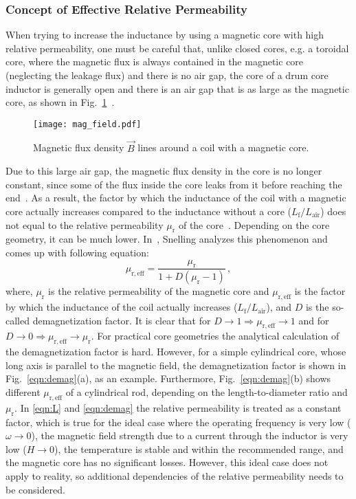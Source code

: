 \subsubsection{Concept of Effective Relative Permeability}
When trying to increase the inductance by using a magnetic core with high relative permeability, one must be careful that, unlike closed cores, e.g. a toroidal core, where the magnetic flux is always contained in the magnetic core (neglecting the leakage flux) and there is no air gap, the core of a drum core inductor is generally open and there is an air gap that is as large as the magnetic core, as shown in Fig.~\ref{fig:field}~\cite{snelling}.
\begin{figure}[ptb]
	\centering
	\texttt{[image: mag\_field.pdf]}
	\caption{Magnetic flux density $\vec{B}$ lines around a coil with a magnetic core.}
	\label{fig:field}
\end{figure}
Due to this large air gap, the magnetic flux density in the core is no longer constant, since some of the flux inside the core leaks from it before reaching the end~\cite{snelling}. As a result, the factor by which the inductance of the coil with a magnetic core actually increases compared to the inductance without a core ($L_{\mathrm{f}}/L_{\mathrm{air}}$) does not equal to the relative permeability $\mu_\mathrm{r}$ of the core~\cite{snelling}. Depending on the core geometry, it can be much lower. In~\cite{snelling}, Snelling analyzes this phenomenon and comes up with following equation:
\begin{equation} \label{eqn:demag}
	\mu_{\mathrm{r,eff}} = \frac{\mu_\mathrm{r}}{1+D(\mu_\mathrm{r}-1)}\,,
\end{equation}
where, $\mu_{\mathrm{r}}$ is the relative permeability of the magnetic core and $\mu_{\mathrm{r,eff}}$ is the factor by which the inductance of the coil actually increases ($L_{\mathrm{f}}/L_{\mathrm{air}}$), and $D$ is the so-called demagnetization factor. It is clear that for ${D \rightarrow 1 \Rightarrow \mu_{\mathrm{r,eff}} \rightarrow 1}$ and for ${D \rightarrow 0 \Rightarrow \mu_{\mathrm{r,eff}} \rightarrow \mu_{\mathrm{r}}}$. For practical core geometries the analytical calculation of the demagnetization factor is hard. However, for a simple cylindrical core, whose long axis is parallel to the magnetic field, the demagnetization factor is shown in Fig.~\ref{eqn:demag}(a), as an example. Furthermore, Fig.~\ref{eqn:demag}(b) shows different $\mu_{\mathrm{r,eff}}$ of a cylindrical rod, depending on the length-to-diameter ratio and $\mu_{\mathrm{r}}$. In \eqref{eqn:L} and \eqref{eqn:demag} the relative permeability is treated as a constant factor, which is true for the ideal case where the operating frequency is very low ($\omega \rightarrow 0$), the magnetic field strength due to a current through the inductor is very low ($H \rightarrow 0$), the temperature is stable and within the recommended range, and the magnetic core has no significant losses. However, this ideal case does not apply to reality, so additional dependencies of the relative permeability needs to be considered.

